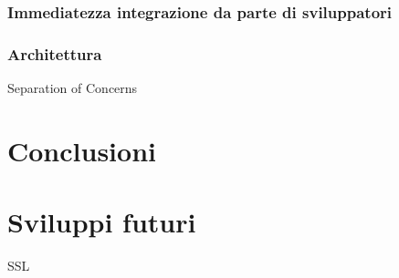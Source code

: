 \documentclass[12pt,a4paper,openright]{report}
\begin{document}
\subsection{Immediatezza integrazione da parte di sviluppatori}

\subsection{Architettura}
Separation of Concerns

\clearpage{\pagestyle{empty}\cleardoublepage}
\chapter*{Conclusioni}

\chapter{Sviluppi futuri}
SSL
\clearpage{\pagestyle{empty}\cleardoublepage}




\end{document}
